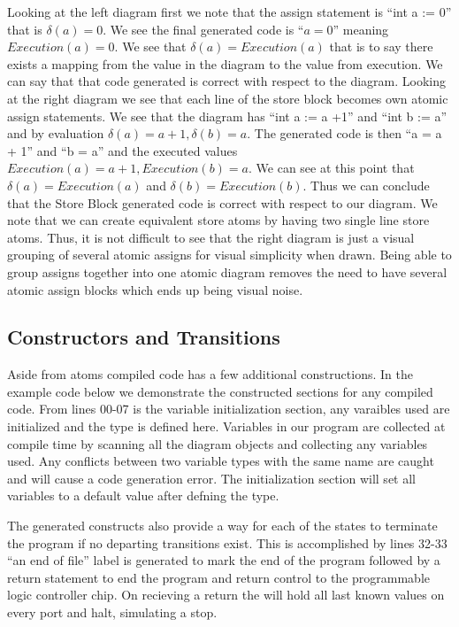 Looking at the left diagram first we note that the assign statement is ``int a := 0'' that is $\delta(a) = 0$. We see the final generated code is ``$a = 0$'' meaning $Execution(a) = 0$. We see that $\delta(a) = Execution(a)$ that is to say there exists a mapping from the value in the diagram to the value from execution. We can say that that code generated is correct with respect to the diagram. Looking at the right diagram we see that each line of the store block becomes own atomic assign statements. We see that the diagram has ``int a := a +1'' and ``int b := a'' and by evaluation $\delta(a) = a + 1, \delta(b) = a$. The generated code is then ``a = a + 1'' and ``b = a'' and the executed values $Execution(a) = a + 1, Execution(b) = a$. We can see at this point that $\delta(a) = Execution(a)$ and $\delta(b) = Execution(b)$. Thus we can conclude that the Store Block generated code is correct with respect to our diagram. We note that we can create equivalent store atoms by having two single line store atoms. Thus, it is not difficult to see that the right diagram is just a visual grouping of several atomic assigns for visual simplicity when drawn. Being able to group assigns together into one atomic diagram removes the need to have several atomic assign blocks which ends up being visual noise.


\subsection{Constructors and Transitions}

Aside from atoms compiled code has a few additional constructions. In the example code below we demonstrate the constructed sections for any compiled code. From lines 00-07 is the variable initialization section, any varaibles used are initialized and the type is defined here. Variables in our program are collected at compile time by scanning all the diagram objects and collecting any variables used. Any conflicts between two variable types with the same name are caught and will cause a code generation error. The initialization section will set all variables to a default value after defning the type.

The generated constructs also provide a way for each of the states to terminate the program if no departing transitions exist. This is accomplished by lines 32-33 ``an end of file'' label is generated to mark the end of the program followed by a return statement to end the program and return control to the programmable logic controller chip. On recieving a return the  will hold all last known values on every port and halt, simulating a stop.


